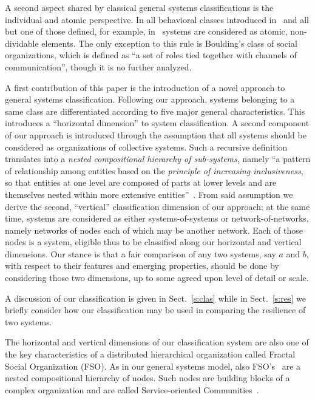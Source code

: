 \documentclass[twocolumn]{svjour3}
\begin{document}
A second aspect shared by classical general systems classifications is the individual
and atomic perspective. In all behavioral classes introduced in~\cite{RWB43} and all
but one of those defined, for example, in~\cite{Bou56} systems are
considered as atomic, non-dividable elements.
The only exception to this rule is Boulding's class of social organizations, which is defined
as ``a set of roles  tied together with channels of communication'', though it is no further
analyzed.

A first contribution of this paper is the introduction
of a novel approach to general systems classification.
Following our approach, systems belonging to a same class are
differentiated according to five major general characteristics.
This introduces a ``horizontal dimension'' to system classification.
A second component of our approach is introduced through the assumption
that all systems should be considered as organizations of collective systems.
Such a recursive definition translates into a \emph{nested compositional hierarchy of sub-systems}, namely
``a pattern of relationship among entities based on the \emph{principle of increasing inclusiveness},
so that entities at one level are composed of parts at lower levels and are themselves nested
within more extensive entities''~\cite{HT:TE14a}. From said assumption we derive
the second,
``vertical'' classification dimension of our approach:
at the same time, systems are considered as either systems-of-systems or network-of-networks,
namely networks of nodes each of which may be another network.
Each of those nodes is a system, eligible thus to be classified along our horizontal
and vertical dimensions. Our stance is that a fair comparison of any two systems,
say $a$ and $b$, with respect to their features and emerging properties, should
be done by considering those two dimensions, up to some agreed upon level of detail or scale.

A discussion of our classification is
given in Sect.~\ref{s:clas} while in Sect.~\ref{s:res} we briefly consider how
our classification may be used in comparing the resilience of two systems.







The horizontal and vertical dimensions of our classification system are also one of the key
characteristics of a distributed hierarchical organization called Fractal Social Organization (FSO).
As in our general systems model, also FSO's~\cite{DF13c,DeFPa15a,DF15a} are a nested compositional
hierarchy of nodes. Such nodes are building blocks of a complex organization and are
called Service-oriented Communities~\cite{DeBl10,DFCBD12}.
\end{document}
